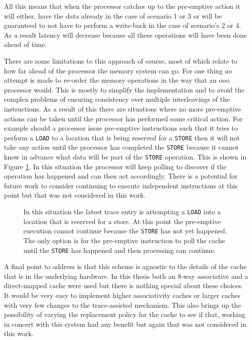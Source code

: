 All this means that when the processor catches up to the pre-emptive action it will either, have the data already in the case of scenario 1 or 3 or will be guaranteed to not have to perform a write-back in the case of scenario's 2 or 4. As a result latency will decrease because all these operations will have been done ahead of time. 

There are some limitations to this approach of course, most of which relate to how far ahead of the processor the memory system can go. For one thing no attempt is made to re-order the memory operations in the way that an \gls{ooo} processor would. This is mostly to simplify the implementation and to avoid the complex problems of ensuring consistency over multiple interleavings of the instructions. As a result of this there are situations where no more pre-emptive actions can be taken until the processor has performed some critical action. For example should a processor issue pre-emptive instructions such that it tries to perform a \texttt{LOAD} to a location that is being reserved for a \texttt{STORE} then it will not take any action until the processor has completed the \texttt{STORE} because it cannot know in advance what data will be part of the \texttt{STORE} operation. This is shown in Figure \ref{fig:problem-scenario}. In this situation the processor will keep polling to discover if the operation has happened and can then act accordingly. There is a potential for future work to consider continuing to execute independent instructions at this point but that was not considered in this work. 

\begin{figure} [htbp]
	\begin{center}
		
		\caption[Illustration of a Block on Pre-emptive Actions]{In this situation the latest trace entry is attempting a \texttt{LOAD} into a location that is reserved for a store. At this point the pre-emptive execution cannot continue because the \texttt{STORE} has not yet happened. The only option is for the pre-emptive instruction to poll the cache until the \texttt{STORE} has happened and then processing can continue.}
		\label{fig:problem-scenario}
	\end{center}
\end{figure}

A final point to address is that this scheme is agnostic to the details of the cache that is in the underlying hardware. In this thesis both an 8-way associative and a direct-mapped cache were used but there is nothing special about these choices. It would be very easy to implement higher associativity caches or larger caches with very few changes to the trace-assisted mechanism. This also brings up the possibility of varying the replacement policy for the cache to see if that, working in concert with this system had any benefit but again that was not considered in this work. 

